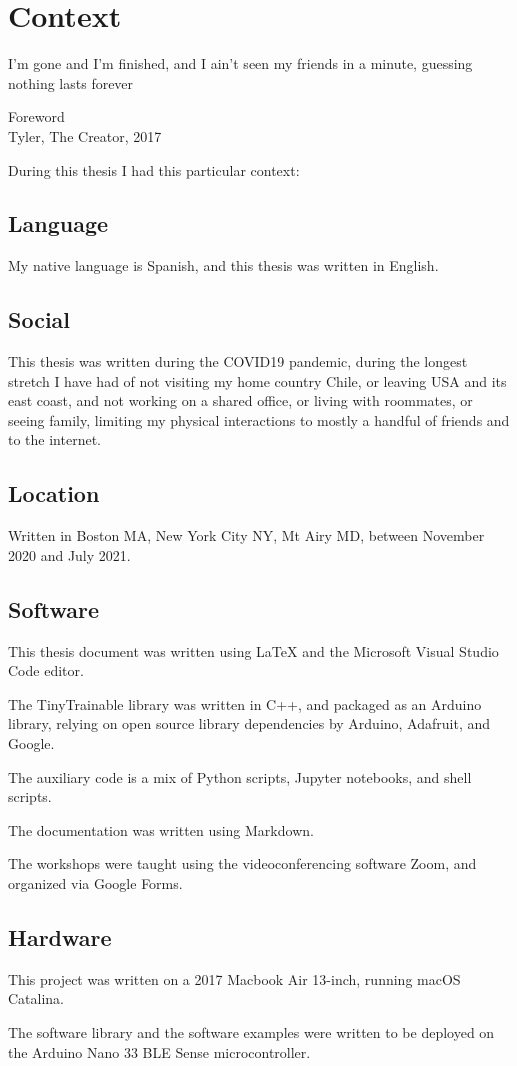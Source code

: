 \chapter{Context}

\epigraph{I'm gone and I'm finished, and I ain't seen my friends in a minute, guessing nothing lasts forever}{Foreword \\ Tyler, The Creator, 2017}

During this thesis I had this particular context:

\section{Language}

My native language is Spanish, and this thesis was written in English.

\section{Social}

This thesis was written during the COVID19 pandemic, during the longest stretch I have had of not visiting my home country Chile, or leaving USA and its east coast, and not working on a shared office, or living with roommates, or seeing family, limiting my physical interactions to mostly a handful of friends and to the internet.

\section{Location}

Written in Boston MA, New York City NY, Mt Airy MD, between November 2020 and July 2021.

\section{Software}

This thesis document was written using LaTeX and the Microsoft Visual Studio Code editor.

The TinyTrainable library was written in C++, and packaged as an Arduino library, relying on open source library dependencies by Arduino, Adafruit, and Google.

The auxiliary code is a mix of Python scripts, Jupyter notebooks, and shell scripts.

The documentation was written using Markdown.

The workshops were taught using the videoconferencing software Zoom, and organized via Google Forms.

\section{Hardware}

This project was written on a 2017 Macbook Air 13-inch, running macOS Catalina.

The software library and the software examples were written to be deployed on the Arduino Nano 33 BLE Sense microcontroller.

\newpage
